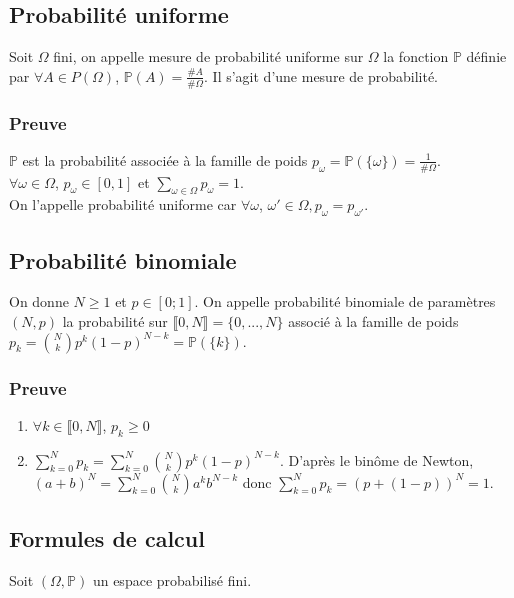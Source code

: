 \documentclass[a4paper,10pt]{book} %
\renewcommand{\P}{\mathbb{P}} %
\begin{document}
\subsection{Probabilité uniforme}
Soit $\Omega$ fini, on appelle mesure de probabilité uniforme sur $\Omega$ la fonction $\P$ définie par $\forall A\in P(\Omega)$, $\P(A)=\frac{\#A}{\#\Omega}$. Il s'agit d'une mesure de probabilité.

\subsubsection{Preuve}
$\P$ est la probabilité associée à la famille de poids $p_\omega=\P(\{\omega\})=\frac{1}{\#\Omega}$.\\

$\forall \omega\in \Omega$, $p_\omega\in [0,1]$ et $\displaystyle \sum_{\omega\in \Omega}p_\omega=1$.\\

On l'appelle probabilité uniforme car $\forall \omega$, $\omega'\in \Omega, p_\omega=p_{\omega'}$.

\newpage

\subsection{Probabilité binomiale}
On donne $N\geq 1$ et $p\in [0;1]$. On appelle probabilité binomiale de paramètres $(N,p)$ la probabilité sur $\llbracket 0,N\rrbracket=\{0,...,N\}$ associé à la famille de poids $\displaystyle p_k=\binom{N}{k}p^k(1-p)^{N-k}=\P(\{k\})$.

\subsubsection{Preuve}
\begin{enumerate}
\item $\forall k\in \llbracket 0,N\rrbracket$, $p_k\geq 0$
\item $\displaystyle \sum_{k=0}^Np_k=\sum_{k=0}^N\binom{N}{k}p^k(1-p)^{N-k}$. D'après le binôme de Newton, $\displaystyle (a+b)^N=\sum_{k=0}^N\binom{N}{k}a^kb^{N-k}$ donc $\displaystyle \sum_{k=0}^Np_k=(p+(1-p))^{N}=1$.
\end{enumerate}

\subsection{Formules de calcul}
Soit $(\Omega,\P)$ un espace probabilisé fini.
\end{document}
